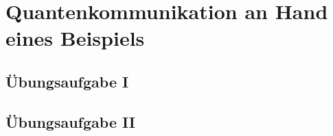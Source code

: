 \section{Quantenkommunikation an Hand eines Beispiels}
\begin{frame}[allowframebreaks]
	
\end{frame}

\subsection{{\"U}bungsaufgabe I}
\begin{frame}[allowframebreaks]
	
\end{frame}

\subsection{{\"U}bungsaufgabe II}
\begin{frame}[allowframebreaks]
	
\end{frame}